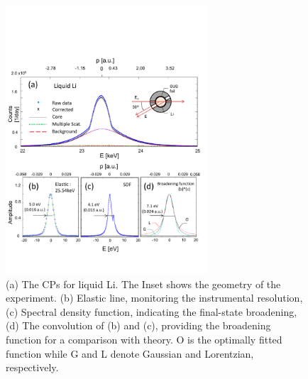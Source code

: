 \documentclass[twocolumn,showpacs,showkeys,fleqn,prl,superscriptaddress]{revtex4}%
\begin{document}
\begin{figure}
\includegraphics[bb= 30 50 500 600, width=7.5cm]{fig1.pdf}
\caption{(a) The CPs for liquid Li. The Inset shows the geometry of the experiment. (b) Elastic line, monitoring the instrumental resolution, 
(c) Spectral density function, indicating the final-state broadening, (d) The convolution of \small{(b)} and (c), providing the broadening function for a comparison with theory. O is the optimally fitted function while G and L denote Gaussian and Lorentzian, respectively.
} 
\label{Fig.1}
\end{figure}
\end{document}
